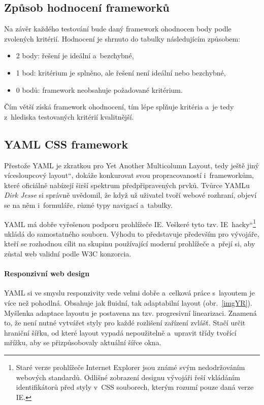 \documentclass[thesis=B,czech]{FITthesis}[2012/06/26]
\begin{document}
\subsection{Způsob hodnocení frameworků}

Na závěr každého testování bude daný framework ohodnocen body podle zvolených kritérií. Hodnocení je shrnuto do tabulky následujícím způsobem:

\begin{itemize}
 \item 2 body: řešení je ideální a~bezchybné,
 \item 1 bod: kritérium je splněno, ale řešení není ideální nebo bezchybné,
 \item 0 bodů: framework neobsahuje požadované kritérium.
\end{itemize}
Čím větší získá framework ohodnocení, tím lépe splňuje kritéria a~je tedy z~hlediska testovaných kritérií kvalitnější.


\subsection{YAML CSS framework}

Přestože \gls{YAML} je zkratkou pro Yet Another Multicolumn Layout, tedy \quotedblbase ještě jiný vícesloupcový layout\textquotedblleft , dokáže konkurovat svou propracovaností i~frameworkům, které oficiálně nabízejí širší spektrum předpřipravených prvků. Tvůrce \gls{YAML}u \textit{Dirk Jesse} si správně uvědomil, že když už uživatel tvoří webové rozhraní, objeví se na něm i~formuláře, různé typy navigací a~tabulky. 

\gls{YAML} má dobře vyřešenou podporu prohlížeče \gls{IE}. Veškeré tyto tzv. \quotedblbase IE~hacky\textquotedblleft\footnote{Staré verze prohlížeče Internet Explorer jsou známé svým nedodržováním webových standardů. Odlišné zobrazení designu vývojáři řeší vkládáním identifikátorů před styly v~\gls{CSS} souborech, kterým rozumí pouze daná verze IE.} ukládá do samostatného souboru. Výhodu to představuje především pro vývojáře, kteří se rozhodnou cílit na skupinu používající moderní prohlížeče a~přejí si, aby zůstal web validní podle \gls{W3C} konzorcia. 

\paragraph{Responzivní web design}

\gls{YAML} si ve smyslu responzivity vede velmi dobře a~celková práce s~layoutem je více než pohodlná. Obsahuje jak fluidní, tak adaptabilní layout (obr.~\ref{imgYR}). Myšlenka adaptace layoutu je postavena na tzv. progresivní linearizaci. Znamená to, že není nutné vytvářet styly pro každé rozlišení zařízení zvlášť. Stačí určit hraniční šířku, od které layout vypadá nepoužitelně a~upravit třídy tvořící mřížku, aby se přizpůsobovaly aktuální šířce okna.
\end{document}
